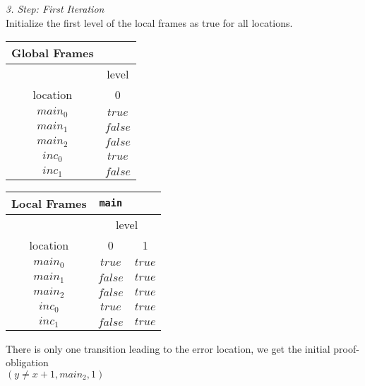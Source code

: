 \documentclass{article}
\begin{document}
	\vspace*{1em}
	\textsl{3. Step: First Iteration} \\
	Initialize the first level of the local frames as true for all locations. \\
	\begin{minipage}{.5\textwidth}
	\setlength\tabcolsep{0.35em}
	\begin{center}
		\begin{tabu}{cc}
			Global Frames \\
			\toprule
			& level \\
			\cmidrule(lr){2-2}
			location & 0 \\
			$main_0$ & $true$ \\
			$main_1$ & $false$ \\
			$main_2$ & $false$ \\
			$inc_0$ & $true$ \\
			$inc_1$ & $false$\\
			\bottomrule
		\end{tabu}
	\end{center}
	\end{minipage}
	\hfill
	\begin{minipage}{.4\textwidth}
		\setlength\tabcolsep{0.35em}
		\begin{center}
			\begin{tabu}{ccc}
				Local Frames & \texttt{main}\\
				\toprule
				& \multicolumn{2}{c}{level} \\
				\cmidrule(lr){2-3}
				location & 0 & 1 \\
				\cmidrule{1-3}
				$main_0$ & $true$ & $true$ \\
				$main_1$ & $false$ & $true$\\
				$main_2$ & $false$ & $true$\\
				$inc_0$ & $true$ & $true$\\
				$inc_1$ & $false$ & $true$\\
				\bottomrule
			\end{tabu}
		\end{center}	
	\end{minipage}
	
	\vspace*{1em}

	There is only one transition leading to the error location, we get the initial proof-obligation \\ $(y \neq x + 1, main_2, 1)$  \\ \\
	
\end{document}
